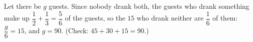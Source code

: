 Let there be $g$ guests. Since nobody drank both, the guests who drank something make up $\dfrac{1}{2}+\dfrac{1}{3}=\dfrac{5}{6}$ of the guests, so the $15$ who drank neither are $\dfrac{1}{6}$ of them: $\dfrac {g}{6}=15$, and $g=\boxed{90}$. (Check: $45+30+15=90$.)
